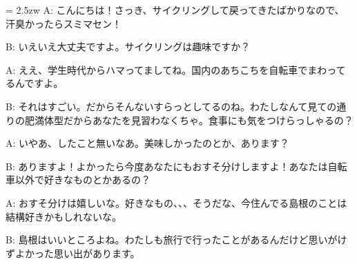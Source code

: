 \documentclass[11pt]{amsart}
\title{}
\author{}
\newenvironment{hangall}[1]{\hangindent = 2.5zw\everypar{\hangindent = 2.5zw}}{}
\begin{document}
\maketitle
\begin{hangall}{}%
A: こんにちは！さっき、サイクリングして戻ってきたばかりなので、汗臭かったらスミマセン！



B: いえいえ大丈夫ですよ。サイクリングは趣味ですか？



A: ええ、学生時代からハマってましてね。国内のあちこちを自転車でまわってるんですよ。



B: それはすごい。だからそんないすらっとしてるのね。わたしなんて見ての通りの肥満体型だからあなたを見習わなくちゃ。食事にも気をつけらっしゃるの？



A: いやあ、したこと無いなあ。美味しかったのとか、あります？



B: ありますよ！よかったら今度あなたにもおすそ分けしますよ！あなたは自転車以外で好きなものとかあるの？



A: おすそ分けは嬉しいな。好きなもの、、、そうだな、今住んでる島根のことは結構好きかもしれないな。



B: 島根はいいところよね。わたしも旅行で行ったことがあるんだけど思いがけずよかった思い出があります。\end{hangall}
\end{document}
